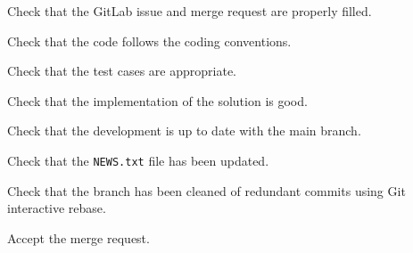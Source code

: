 \begin{todolist}
\setlength\itemsep{0.01em}
\item Check that the GitLab issue and merge request are properly filled.
\item Check that the code follows the coding conventions.
\item Check that the test cases are appropriate.
\item Check that the implementation of the solution is good.
\item Check that the development is up to date with the main branch.
\item Check that the \verb!NEWS.txt! file has been updated.
\item Check that the branch has been cleaned of redundant commits using
  Git interactive rebase.
\item Accept the merge request.
\end{todolist}
